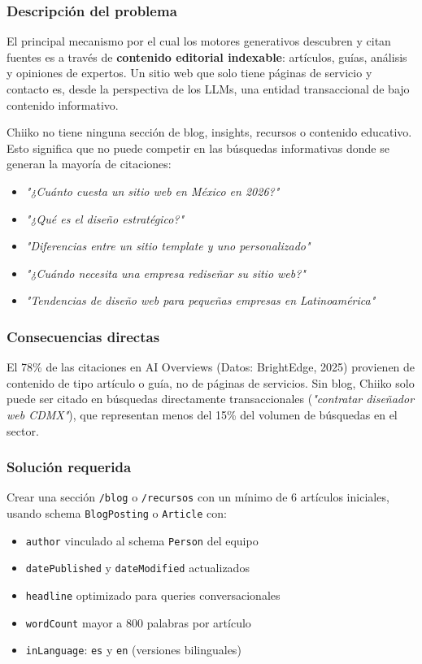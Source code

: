\documentclass[12pt, a4paper]{article}
\begin{document}
\subsubsection{Descripción del problema}

El principal mecanismo por el cual los motores generativos descubren y citan fuentes es a través de \textbf{contenido editorial indexable}: artículos, guías, análisis y opiniones de expertos. Un sitio web que solo tiene páginas de servicio y contacto es, desde la perspectiva de los LLMs, una entidad transaccional de bajo contenido informativo.

Chiiko no tiene ninguna sección de blog, insights, recursos o contenido educativo. Esto significa que no puede competir en las búsquedas informativas donde se generan la mayoría de citaciones:

\begin{itemize}[itemsep=3pt]
  \item \textit{"¿Cuánto cuesta un sitio web en México en 2026?"}
  \item \textit{"¿Qué es el diseño estratégico?"}
  \item \textit{"Diferencias entre un sitio template y uno personalizado"}
  \item \textit{"¿Cuándo necesita una empresa rediseñar su sitio web?"}
  \item \textit{"Tendencias de diseño web para pequeñas empresas en Latinoamérica"}
\end{itemize}

\subsubsection{Consecuencias directas}

El 78\% de las citaciones en AI Overviews (Datos: BrightEdge, 2025) provienen de contenido de tipo artículo o guía, no de páginas de servicios. Sin blog, Chiiko solo puede ser citado en búsquedas directamente transaccionales (\textit{"contratar diseñador web CDMX"}), que representan menos del 15\% del volumen de búsquedas en el sector.

\subsubsection{Solución requerida}

Crear una sección \texttt{/blog} o \texttt{/recursos} con un mínimo de 6 artículos iniciales, usando schema \texttt{BlogPosting} o \texttt{Article} con:
\begin{itemize}[itemsep=3pt]
  \item \texttt{author} vinculado al schema \texttt{Person} del equipo
  \item \texttt{datePublished} y \texttt{dateModified} actualizados
  \item \texttt{headline} optimizado para queries conversacionales
  \item \texttt{wordCount} mayor a 800 palabras por artículo
  \item \texttt{inLanguage}: \texttt{es} y \texttt{en} (versiones bilinguales)
\end{itemize}
\end{document}
